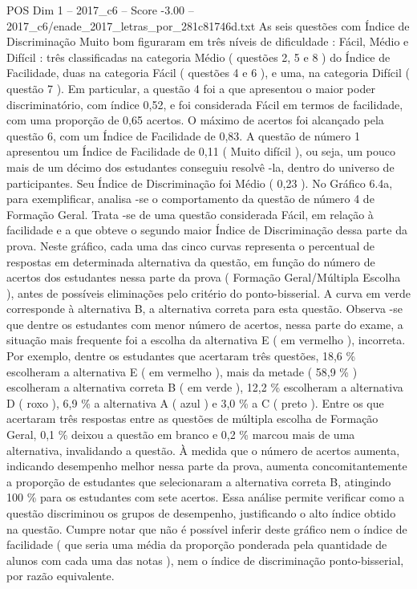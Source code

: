 \begin{textsample}{POS Dim 1 – 2017\_c6 – Score -3.00 – 2017\_c6/enade\_2017\_letras\_por\_281c81746d.txt}
As seis questões com Índice de Discriminação Muito bom figuraram em três níveis de dificuldade : Fácil, Médio e Difícil : três classificadas na categoria Médio ( questões 2, 5 e 8 ) do Índice de Facilidade, duas na categoria Fácil ( questões 4 e 6 ), e uma, na categoria Difícil ( questão 7 ).
Em particular, a questão 4 foi a que apresentou o maior poder discriminatório, com índice 0,52, e foi considerada Fácil em termos de facilidade, com uma proporção de 0,65 acertos.
O máximo de acertos foi alcançado pela questão 6, com um Índice de Facilidade de 0,83.
A questão de número 1 apresentou um Índice de Facilidade de 0,11 ( Muito difícil ), ou seja, um pouco mais de um décimo dos estudantes conseguiu resolvê -la, dentro do universo de participantes.
Seu Índice de Discriminação foi Médio ( 0,23 ).
No Gráfico 6.4a, para exemplificar, analisa -se o comportamento da questão de número 4 de Formação Geral.
Trata -se de uma questão considerada Fácil, em relação à facilidade e a que obteve o segundo maior Índice de Discriminação dessa parte da prova.
Neste gráfico, cada uma das cinco curvas representa o percentual de respostas em determinada alternativa da questão, em função do número de acertos dos estudantes nessa parte da prova ( Formação Geral/Múltipla Escolha ), antes de possíveis eliminações pelo critério do ponto-bisserial.
A curva em verde corresponde à alternativa B, a alternativa correta para esta questão.
Observa -se que dentre os estudantes com menor número de acertos, nessa parte do exame, a situação mais frequente foi a escolha da alternativa E ( em vermelho ), incorreta.
Por exemplo, dentre os estudantes que acertaram três questões, 18,6 \% escolheram a alternativa E ( em vermelho ), mais da metade ( 58,9 \% ) escolheram a alternativa correta B ( em verde ), 12,2 \% escolheram a alternativa D ( roxo ), 6,9 \% a alternativa A ( azul ) e 3,0 \% a C ( preto ).
Entre os que acertaram três respostas entre as questões de múltipla escolha de Formação Geral, 0,1 \% deixou a questão em branco e 0,2 \% marcou mais de uma alternativa, invalidando a questão.
À medida que o número de acertos aumenta, indicando desempenho melhor nessa parte da prova, aumenta concomitantemente a proporção de estudantes que selecionaram a alternativa correta B, atingindo 100 \% para os estudantes com sete acertos.
Essa análise permite verificar como a questão discriminou os grupos de desempenho, justificando o alto índice obtido na questão.
Cumpre notar que não é possível inferir deste gráfico nem o índice de facilidade ( que seria uma média da proporção ponderada pela quantidade de alunos com cada uma das notas ), nem o índice de discriminação ponto-bisserial, por razão equivalente.

\end{textsample}
